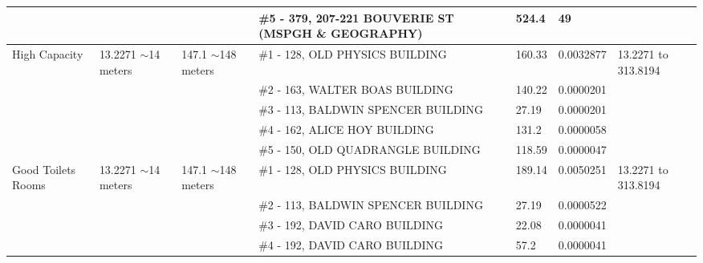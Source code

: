 \begin{table}[H]
{\begin{tabular}{|l|l|l|l|l|l|l|}
                   &                           &                                                 & \#5 - 379, 207-221 BOUVERIE ST (MSPGH \& GEOGRAPHY)   & 524.4         & 49              &                           \\ \hline
High Capacity      & 13.2271 $\sim$14 meters   & 147.1 $\sim$148  meters                         & \#1 - 128, OLD PHYSICS BUILDING                       & 160.33        & 0.0032877       & 13.2271 to 313.8194       \\ \hline
                   &                           &                                                 & \#2 - 163, WALTER BOAS BUILDING                       & 140.22        & 0.0000201       &                           \\ \hline
                   &                           &                                                 & \#3 - 113, BALDWIN SPENCER BUILDING                   & 27.19         & 0.0000201       &                           \\ \hline
                   &                           &                                                 & \#4 - 162, ALICE HOY BUILDING                         & 131.2         & 0.0000058       &                           \\ \hline
                   &                           &                                                 & \#5 - 150, OLD QUADRANGLE BUILDING                    & 118.59        & 0.0000047       &                           \\ \hline
Good Toilets Rooms & 13.2271 $\sim$14 meters   & 147.1 $\sim$148  meters                         & \#1 - 128, OLD PHYSICS BUILDING                       & 189.14        & 0.0050251       & 13.2271 to 313.8194       \\ \hline
                   &                           &                                                 & \#2 - 113, BALDWIN SPENCER BUILDING                   & 27.19         & 0.0000522       &                           \\ \hline
                   &                           &                                                 & \#3 - 192, DAVID CARO BUILDING                        & 22.08         & 0.0000041       &                           \\ \hline
                   &                           &                                                 & \#4 - 192, DAVID CARO BUILDING                        & 57.2          & 0.0000041       &                           \\ \hline

\end{tabular}}
\end{table}
